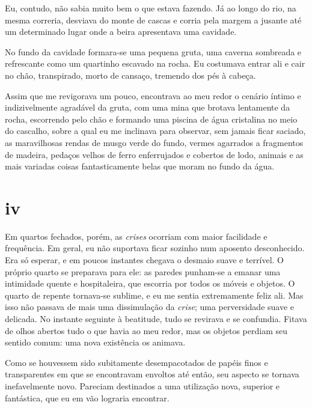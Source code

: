Eu, contudo, não sabia muito bem o que estava fazendo. Já ao longo do rio, na
mesma correria, desviava do monte de cascas e corria pela margem a jusante
até um determinado lugar onde a beira apresentava uma cavidade.

No fundo da cavidade formara-se uma pequena gruta, uma caverna sombreada e
refrescante como um quartinho escavado na rocha. Eu costumava entrar ali e
cair no chão, transpirado, morto de cansaço, tremendo dos pés à cabeça.

Assim que me revigorava um pouco, encontrava ao meu redor o cenário íntimo e
indizivelmente agradável da gruta, com uma mina que brotava lentamente da
rocha, escorrendo pelo chão e formando uma piscina de água cristalina no meio
do cascalho, sobre a qual eu me inclinava para observar, sem jamais ficar
saciado, as maravilhosas rendas de musgo verde do fundo, vermes agarrados a
fragmentos de madeira, pedaços velhos de ferro enferrujados e cobertos de
lodo, animais e as mais variadas coisas fantasticamente belas que moram no
fundo da água.

\section{iv} 

 

Em quartos fechados, porém, as \textit{crises} ocorriam com maior facilidade e
frequência. Em geral, eu não suportava ficar sozinho num aposento
desconhecido. Era só esperar, e em poucos instantes chegava o desmaio suave e
terrível. O próprio quarto se preparava para ele: as paredes punham-se a
emanar uma intimidade quente e hospitaleira, que escorria por todos os móveis
e objetos. O quarto de repente tornava-se sublime, e eu me sentia
extremamente feliz ali. Mas isso não passava de mais uma dissimulação
da \textit{crise}; uma perversidade suave e delicada. No instante seguinte à
beatitude, tudo se revirava e se confundia. Fitava de olhos abertos tudo o
que havia ao meu redor, mas os objetos perdiam seu sentido comum: uma nova
existência os animava.

Como se houvessem sido subitamente desempacotados de papéis finos e
transparentes em que se encontravam envoltos até então, seu aspecto se
tornava inefavelmente novo. Pareciam destinados a uma utilização nova,
superior e fantástica, que eu em vão lograria encontrar.

